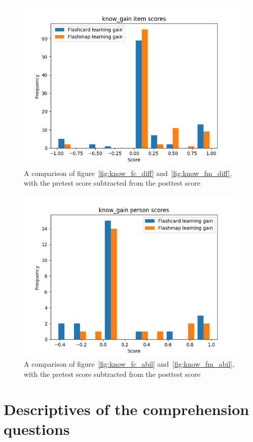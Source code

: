\begin{figure}
    \centering
    \includegraphics[width=.7\textwidth]{img/know_gain_diff.png}
    \caption{A comparison of figure~\protect\ref{fig:know_fc_diff} and~\protect\ref{fig:know_fm_diff}, with the pretest score subtracted from the posttest score}
    \label{fig:know_gain_diff}
\end{figure}
\begin{figure}
    \centering
    \includegraphics[width=.7\textwidth]{img/know_gain_abil.png}
    \caption{A comparison of figure~\protect\ref{fig:know_fc_abil} and~\protect\ref{fig:know_fm_abil}, with the pretest score subtracted from the posttest score}
    \label{fig:know_gain_abil}
\end{figure}

\FloatBarrier
\section{Descriptives of the comprehension questions}

